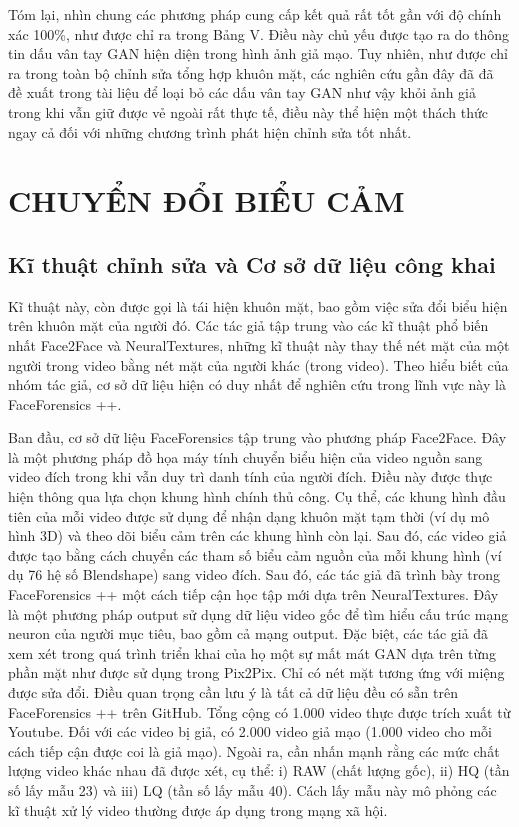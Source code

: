 \documentclass{article}
\begin{document}
Tóm lại, nhìn chung các phương pháp cung cấp kết quả rất tốt gần với độ chính xác 100\%, như được chỉ ra trong Bảng V. Điều này chủ yếu được tạo ra do thông tin dấu vân tay GAN hiện diện trong hình ảnh giả mạo. Tuy nhiên, như được chỉ ra trong toàn bộ chỉnh sửa tổng hợp khuôn mặt, các nghiên cứu gần đây đã đã đề xuất trong tài liệu để loại bỏ các dấu vân tay GAN như vậy khỏi ảnh giả trong khi vẫn giữ được vẻ ngoài rất thực tế, điều này thể hiện một thách thức ngay cả đối với những chương trình phát hiện chỉnh sửa tốt nhất.

\section{CHUYỂN ĐỔI BIỂU CẢM} \label{sec:6-expression}

\subsection{Kĩ thuật chỉnh sửa và Cơ sở dữ liệu công khai} \label{sec:6-a-technique}

Kĩ thuật này, còn được gọi là tái hiện khuôn mặt, bao gồm việc sửa đổi biểu hiện trên khuôn mặt của người đó. Các tác giả tập trung vào các kĩ thuật phổ biến nhất Face2Face và NeuralTextures, những kĩ thuật này thay thế nét mặt của một người trong video bằng nét mặt của người khác (trong video). Theo hiểu biết của nhóm tác giả, cơ sở dữ liệu hiện có duy nhất để nghiên cứu trong lĩnh vực này là FaceForensics ++.

Ban đầu, cơ sở dữ liệu FaceForensics tập trung vào phương pháp Face2Face. Đây là một phương pháp đồ họa máy tính chuyển biểu hiện của video nguồn sang video đích trong khi vẫn duy trì danh tính của người đích. Điều này được thực hiện thông qua lựa chọn khung hình chính thủ công. Cụ thể, các khung hình đầu tiên của mỗi video được sử dụng để nhận dạng khuôn mặt tạm thời (ví dụ mô hình 3D) và theo dõi biểu cảm trên các khung hình còn lại. Sau đó, các video giả được tạo bằng cách chuyển các tham số biểu cảm nguồn của mỗi khung hình (ví dụ 76 hệ số Blendshape) sang video đích. Sau đó, các tác giả đã trình bày trong FaceForensics ++ một cách tiếp cận học tập mới dựa trên NeuralTextures. Đây là một phương pháp output sử dụng dữ liệu video gốc để tìm hiểu cấu trúc mạng neuron của người mục tiêu, bao gồm cả mạng output. Đặc biệt, các tác giả đã xem xét trong quá trình triển khai của họ một sự mất mát GAN dựa trên từng phần mặt như được sử dụng trong Pix2Pix. Chỉ có nét mặt tương ứng với miệng được sửa đổi. Điều quan trọng cần lưu ý là tất cả dữ liệu đều có sẵn trên FaceForensics ++ trên GitHub. Tổng cộng có 1.000 video thực được trích xuất từ Youtube. Đối với các video bị giả, có 2.000 video giả mạo (1.000 video cho mỗi cách tiếp cận được coi là giả mạo). Ngoài ra, cần nhấn mạnh rằng các mức chất lượng video khác nhau đã được xét, cụ thể: i) RAW (chất lượng gốc), ii) HQ (tần số lấy mẫu 23) và iii) LQ (tần số lấy mẫu 40). Cách lấy mẫu này mô phỏng các kĩ thuật xử lý video thường được áp dụng trong mạng xã hội.
\end{document}
